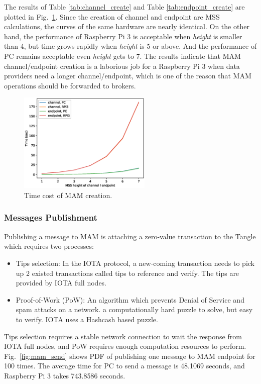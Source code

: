\documentclass[conference]{IEEEtran}
\begin{document}
The results of Table \ref{tab:channel_create} and Table \ref{tab:endpoint_create} are plotted in Fig.~\ref{fig:mam_create}. Since the creation of channel and endpoint are MSS calculations, the curves of the same hardware are nearly identical. On the other hand, the performance of Raspberry Pi 3 is acceptable when \textit{height} is smaller than 4, but time grows rapidly when \textit{height} is 5 or above. And the performance of PC remains acceptable even \textit{height} gets to 7. The results indicate that MAM channel/endpoint creation is a laborious job for a Raspberry Pi 3 when data providers need a longer channel/endpoint, which is one of the reason that MAM operations should be forwarded to brokers.
  
\begin{figure}[!t]
    \centering
    \includegraphics[width=2.5in]{mam_create}
    \caption{Time cost of MAM creation.}
    \label{fig:mam_create}
\end{figure}

\subsubsection{Messages Publishment}
Publishing a message to MAM is attaching a zero-value transaction to the Tangle which requires two processes:
\begin{itemize}
	\item	Tips selection: In the IOTA protocol, a new-coming transaction needs to pick up 2 existed transactions called tips to reference and verify. The tips are provided by IOTA full nodes.
	\item	Proof-of-Work (PoW): An algorithm which prevents Denial of Service and spam attacks on a network. a computationally hard puzzle to solve, but easy to verify. IOTA uses a Hashcash\cite{Hashcash} based puzzle.
\end{itemize}

Tips selection requires a stable network connection to wait the response from IOTA full nodes, and PoW requires enough computation resources to perform. Fig.~\ref{fig:mam_send} shows PDF of publishing one message to MAM endpoint for 100 times. The average time for PC to send a message is 48.1069 seconds, and Raspberry Pi 3 takes 743.8586 seconds.
\end{document}
